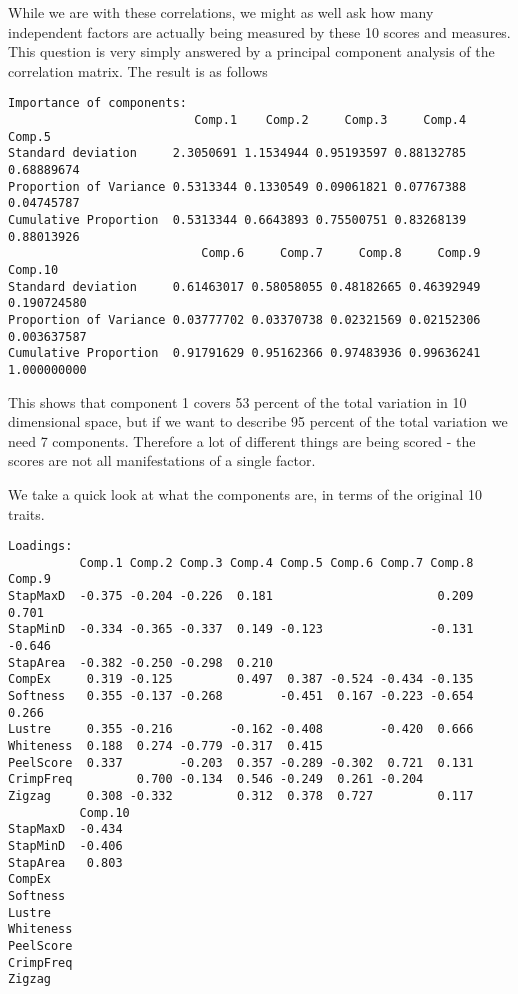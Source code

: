 \documentclass[titlepage]{article}  %
\begin{document}
While we are with these correlations, we might as well ask how many independent factors are actually being measured by these 10 scores and measures. This question is very simply answered by a principal component analysis of the correlation matrix. The result is as follows
\begin{verbatim}
Importance of components:
                          Comp.1    Comp.2     Comp.3     Comp.4     Comp.5
Standard deviation     2.3050691 1.1534944 0.95193597 0.88132785 0.68889674
Proportion of Variance 0.5313344 0.1330549 0.09061821 0.07767388 0.04745787
Cumulative Proportion  0.5313344 0.6643893 0.75500751 0.83268139 0.88013926
                           Comp.6     Comp.7     Comp.8     Comp.9     Comp.10
Standard deviation     0.61463017 0.58058055 0.48182665 0.46392949 0.190724580
Proportion of Variance 0.03777702 0.03370738 0.02321569 0.02152306 0.003637587
Cumulative Proportion  0.91791629 0.95162366 0.97483936 0.99636241 1.000000000
\end{verbatim}

This shows that component 1 covers 53 percent of the total variation in 10 dimensional space, but if we want to describe 95 percent of the total variation we need 7 components. Therefore a lot of different things are being scored - the scores are not all manifestations of a single factor. 

We take a quick look at what the components are, in terms of the original 10 traits. 
\begin{verbatim}
Loadings:
          Comp.1 Comp.2 Comp.3 Comp.4 Comp.5 Comp.6 Comp.7 Comp.8 Comp.9
StapMaxD  -0.375 -0.204 -0.226  0.181                       0.209  0.701
StapMinD  -0.334 -0.365 -0.337  0.149 -0.123               -0.131 -0.646
StapArea  -0.382 -0.250 -0.298  0.210                                   
CompEx     0.319 -0.125         0.497  0.387 -0.524 -0.434 -0.135       
Softness   0.355 -0.137 -0.268        -0.451  0.167 -0.223 -0.654  0.266
Lustre     0.355 -0.216        -0.162 -0.408        -0.420  0.666       
Whiteness  0.188  0.274 -0.779 -0.317  0.415                            
PeelScore  0.337        -0.203  0.357 -0.289 -0.302  0.721  0.131       
CrimpFreq         0.700 -0.134  0.546 -0.249  0.261 -0.204              
Zigzag     0.308 -0.332         0.312  0.378  0.727         0.117       
          Comp.10
StapMaxD  -0.434 
StapMinD  -0.406 
StapArea   0.803 
CompEx           
Softness         
Lustre           
Whiteness        
PeelScore        
CrimpFreq        
Zigzag           
\end{verbatim}
\end{document}
